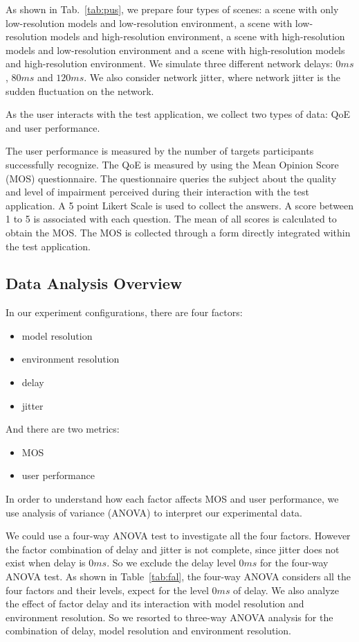 As shown in Tab.~\ref{tab:pus}, we prepare four types of scenes: a scene with only low-resolution models and low-resolution environment, a scene with low-resolution models and high-resolution environment, a scene with high-resolution models and low-resolution environment and a scene with high-resolution models and high-resolution environment.  We simulate three different network delays: $0ms$, $80ms$ and $120ms$. We also consider network jitter, where network jitter is the sudden fluctuation on the network.

As the user interacts with the test application, we collect two types of data: QoE and user performance.

The user performance is measured by the number of targets participants successfully recognize.
The QoE is measured by using the Mean Opinion Score (MOS) questionnaire. The questionnaire queries the subject about the quality and level of impairment perceived during their interaction with the test application.  A 5 point Likert Scale is used to collect the answers. A score between 1 to 5 is associated with each question. The mean of all scores is calculated to obtain the MOS. The MOS is collected through a form directly integrated within the test application.

\subsection{Data Analysis Overview}
\label{sec:dao}

In our experiment configurations, there are four factors:

\begin{itemize}
  \item
  model resolution
  \item
  environment resolution
  \item
  delay
  \item
  jitter
\end{itemize}

And there are two metrics:

\begin{itemize}
  \item
  MOS
  \item
  user performance
\end{itemize}

In order to understand how each factor affects MOS and user performance, we use analysis of variance (ANOVA) to interpret our experimental data.

We could use a four-way ANOVA test to investigate all the four factors. However the factor combination of delay and jitter is not complete, since jitter does not exist when delay is $0ms$. So we exclude the delay level $0ms$ for the four-way ANOVA test.
As shown in Table~\ref{tab:fal}, the four-way ANOVA considers all the four factors and their levels, expect for the level $0ms$ of delay.
We also analyze the effect of factor delay and its interaction with model resolution and environment resolution. So we resorted to three-way ANOVA analysis for the combination of delay, model resolution and environment resolution.


